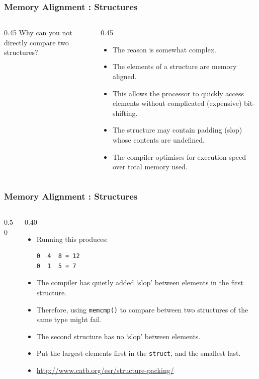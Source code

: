 \begin{frame}[fragile]
\frametitle{Memory Alignment : Structures}
\begin{columns}[T]

\begin{column}{0.45\textwidth}
Why can you not directly compare two structures?


\end{column}

\pause
\begin{column}{0.45\textwidth}
\begin{itemize}[<+->]
\item The reason is somewhat complex.
\item The elements of a structure are memory aligned.
\item This allows the processor to quickly access elements
without complicated (expensive) bit-shifting.
\item The structure may contain padding (slop) whose contents are undefined.
\item The compiler optimises for execution speed over total memory used.
\end{itemize}
\end{column}

\end{columns}
\end{frame}



\begin{frame}[fragile]
\frametitle{Memory Alignment : Structures}
\begin{columns}[T]

\begin{column}{0.50\textwidth}

\end{column}

\pause
\begin{column}{0.40\textwidth}
\begin{itemize}[<+->]
\item Running this produces:
\begin{verbatim}
0  4  8 = 12
0  1  5 = 7
\end{verbatim}
\item The compiler has quietly added `slop' between elements in the first structure.
\item Therefore, using \verb^memcmp()^ to compare between two structures of the same type might fail.
\item The second structure has no `slop' between elements.
\item Put the largest elements first in the \verb^struct^, and the smallest last.
\item \url{http://www.catb.org/esr/structure-packing/}
\end{itemize}
\end{column}

\end{columns}
\end{frame}

